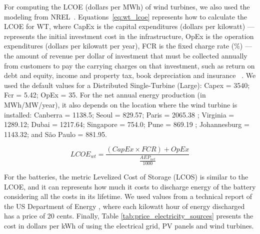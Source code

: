 For computing the LCOE (dollars per MWh) of wind turbines, we also used the modeling from NREL~\cite{nrel_wt_costs_2021}. Equations~\eqref{eq:wt_lcoe} represents how to calculate the LCOE for WT, where CapEx is the capital expenditures (dollars per kilowatt) --- represents the initial investment cost in the infrastructure, OpEx is the operation expenditures (dollars per kilowatt per year), FCR is the fixed charge rate (\%) --- the amount of revenue per dollar of investment that must be collected annually from customers to pay the carrying charges on that investment, such as return on debt and equity, income and property tax, book depreciation and insurance ~\cite{nrel_economic_wt_1995}. We used the default values for a Distributed Single-Turbine (Large): Capex = 3540; Fcr = 5.42; OpEx = 35. For the net annual energy production (in MWh/MW/year), it also depends on the location where the wind turbine is installed: Canberra = 1138.5; Seoul  = 829.57; Paris = 2065.38 ; Virginia = 1289.12; Dubai = 1217.64; Singapore = 754.0; Pune =  869.19 ; Johannesburg = 1143.32; and São Paulo = 881.95.

\begin{equation} \label{eq:wt_lcoe}
  LCOE_{wt} = \frac{ (CapEx \times FCR) + OpEx}{ \frac{AEP_{net}}{1000}   }
\end{equation}

For the batteries, the metric Levelized Cost of Storage (LCOS) is similar to the LCOE, and it can represents how much it costs to discharge energy of the battery considering all the costs in its lifetime. We used values from a technical report of the US Department of Energy \cite{battery_lcos_2022}, where each kilowatt hour of energy discharged has a price of 20 cents. Finally, Table \ref{tab:price_electricity_sources} presents the cost in dollars per kWh of using the electrical grid, PV panels and wind turbines.

